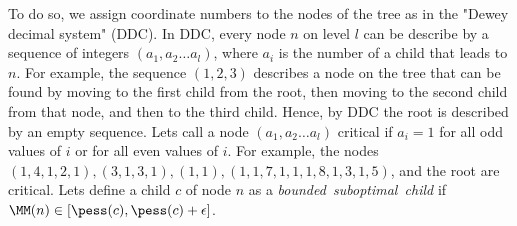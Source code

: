 To do so, we assign coordinate numbers to the nodes of the tree as in the "Dewey decimal system" (DDC). In DDC, every node $n$ on level $l$ can be describe by a sequence of integers $(a_1, a_2 \ldots a_l)$, where $a_i$ is the number of a child
that leads to $n$. For example, the sequence $(1, 2, 3)$ describes a node on the tree that can be found by 
moving to the first child from the root, then moving to the second child from that node, and then to the third child. Hence, by DDC the root is described by an empty sequence. 
Lets call a node $(a_1, a_2 \ldots a_l)$ critical if $a_i=1$ for all odd values of $i$ or for all even values of $i$. For example, the nodes $(1, 4, 1, 2, 1), (3, 1, 3, 1), (1, 1), (1, 1, 7, 1, 1, 1, 8, 1, 3, 1, 5)$, and the root are critical.
Lets define a child $c$ of node $n$ as a \emph{bounded~suboptimal~child} if $\MM(n)\in [\pess(c), \pess(c)+\epsilon]$. 



